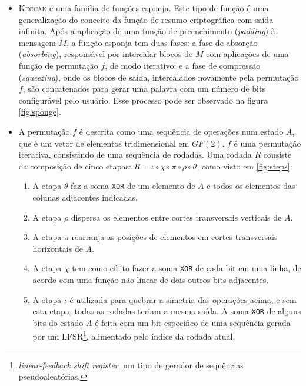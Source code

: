 \documentclass{article}
\begin{document}
\begin{itemize}

\item \textsc{Keccak} é uma família de funções esponja. Este tipo de função é
uma generalização do conceito da função de resumo criptográfica com saída
infinita. Após a aplicação de uma função de preenchimento (\emph{padding}) à
mensagem $M$, a função esponja tem duas fases: a fase de absorção
(\emph{absorbing}), responsável por intercalar blocos de $M$ com aplicações de
uma função de permutação $f$, de modo iterativo; e a fase de compressão
(\emph{squeezing}), onde os blocos de saída, intercalados novamente pela
permutação $f$, são concatenados para gerar uma palavra com um número de bits
configurável pelo usuário. Esse processo pode ser observado na figura
\ref{fig:sponge}.

\item A permutação $f$ é descrita como uma sequência de operações num estado
$A$, que é um vetor de elementos tridimensional em $GF(2)$.
$f$ é uma permutação iterativa, consistindo de uma sequência de rodadas.
Uma rodada $R$ consiste da composição de cinco etapas:
$R = \iota \circ \chi \circ \pi \circ \rho \circ \theta$, como visto
em \ref{fig:steps}:

\begin{enumerate}[label=\roman*.]

\item A etapa $\theta$ faz a soma \texttt{XOR} de um elemento de $A$ e todos
os elementos das colunas adjacentes indicadas.

\item A etapa $\rho$ dispersa os elementos entre cortes transversais verticais
de $A$.

\item A etapa $\pi$ rearranja as posições de elementos em cortes transversais
horizontais de $A$.

\item A etapa $\chi$ tem como efeito fazer a soma \texttt{XOR} de cada bit em
uma linha, de acordo com uma função não-linear de dois outros bits adjacentes.

\item A etapa $\iota$ é utilizada para quebrar a simetria das operações acima,
e sem esta etapa, todas as rodadas teriam a mesma saída. A soma \texttt{XOR} de
alguns bits do estado $A$ é feita com um bit específico de uma sequência gerada
por um LFSR\footnote{\emph{linear-feedback shift register}, um tipo de gerador
de sequências pseudoaleatórias.}, alimentado pelo índice da rodada atual.


\end{enumerate}
\end{itemize}
\end{document}
